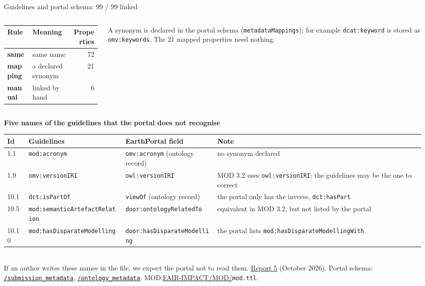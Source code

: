 \documentclass[aspectratio=169,10pt]{beamer}
\newcommand{\evidence}[1]{{\scriptsize\color{epgrey}#1}}
\begin{document}
\begin{frame}{Guidelines and portal schema: 99 / 99 linked}
  \begin{columns}[T]
    \begin{column}{0.40\textwidth}
      \small
      \begin{tabular}{@{}l l r@{}}
        \toprule
        Rule & Meaning & Properties\\
        \midrule
        \textbf{same} & same name & 72\\
        \textbf{mapping} & a declared synonym & 21\\
        \textbf{manual} & linked by hand & 6\\
        \bottomrule
      \end{tabular}
    \end{column}
    \begin{column}{0.56\textwidth}
      \small A synonym is declared in the portal schema (\texttt{metadataMappings}): for example
      \texttt{dcat:keyword} is stored as \texttt{omv:keywords}. The 21 mapped properties need nothing.
    \end{column}
  \end{columns}
  \vspace{8pt}
  {\small\textbf{Five names of the guidelines that the portal does not recognise}}\\[3pt]
  \scriptsize
  \begin{tabularx}{\textwidth}{@{}l l l X@{}}
    \toprule
    Id & Guidelines & EarthPortal field & Note\\
    \midrule
    1.1 & \texttt{mod:acronym} & \texttt{omv:acronym} (ontology record) & no synonym declared\\
    1.9 & \texttt{omv:versionIRI} & \texttt{owl:versionIRI} & MOD 3.2 uses \texttt{owl:versionIRI}: the guidelines may be the one to correct\\
    10.1 & \texttt{dct:isPartOf} & \texttt{viewOf} (ontology record) & the portal only has the inverse, \texttt{dct:hasPart}\\
    10.5 & \texttt{mod:semanticArtefactRelation} & \texttt{door:ontologyRelatedTo} & equivalent in MOD 3.2, but not listed by the portal\\
    10.10 & \texttt{mod:hasDisparateModelling} & \texttt{door:hasDisparateModelling} & the portal lists \texttt{mod:hasDisparateModellingWith}\\
    \bottomrule
  \end{tabularx}\\[4pt]
  \small If an author writes these names in the file, we expect the portal not to read them.
  \vfill
  \evidence{\href{https://github.com/EarthPortal/SA_Management/blob/main/docs/build/emmanuel_dataTerra_Report5-Cheatsheet-vs-EarthPortal.pdf}{Report 5} (October 2026). 
  Portal schema: \href{https://data.earthportal.eu/submission_metadata}{\texttt{/submission\_metadata}}, \href{https://data.earthportal.eu/ontology_metadata}{\texttt{/ontology\_metadata}}; MOD:\href{https://github.com/FAIR-IMPACT/MOD}{FAIR-IMPACT/MOD/}\texttt{mod.ttl}.}
\end{frame}
\end{document}
